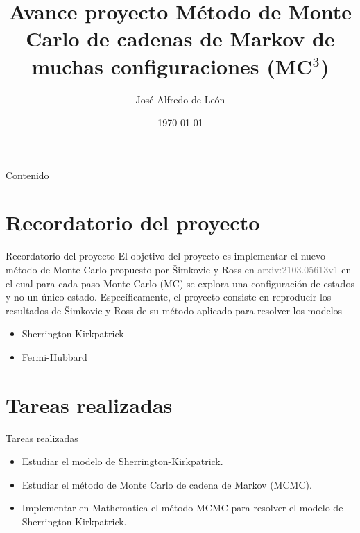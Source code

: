 \documentclass[xcolor=dvipsnames,presentation]{beamer}%
\title[Avance proyecto]%
{\bf Avance proyecto Método de Monte Carlo de cadenas de Markov 
de muchas configuraciones (MC${}^3$)}%
\author[J. A. de León]%
{José Alfredo de León}%
\date{\today}
\newcommand{\shk}{Sherrington-Kirkpatrick}
\newcommand{\syr}{Šimkovic y Ross}
\begin{document}
\begin{frame}[plain]
  \titlepage %
\end{frame}

\begin{frame}{Contenido}
  \tableofcontents[hidesubsections] 
\end{frame}

{
\AtBeginSection{}
\section{Recordatorio del proyecto}
\begin{frame}{Recordatorio del proyecto}
El objetivo del proyecto es implementar el nuevo método de Monte Carlo
propuesto por \syr{} en \textcolor{Gray}{arxiv:2103.05613v1} en el cual
para cada paso Monte Carlo (MC) se explora una configuración de estados
y no un único estado. Específicamente, el proyecto consiste en reproducir
los resultados de \syr{} de su método aplicado para resolver los modelos
\begin{itemize}
\item \shk{}
\item Fermi-Hubbard
\end{itemize}
\end{frame}
}

{
\AtBeginSection{}
\section{Tareas realizadas}
\begin{frame}{Tareas realizadas}
\begin{itemize}
\item Estudiar el modelo de \shk{}.
\item Estudiar el método de Monte Carlo de cadena de Markov (MCMC).
\item Implementar en Mathematica el método MCMC para resolver 
el modelo de \shk{}.
\end{itemize}
\end{frame}
}
\end{document}

